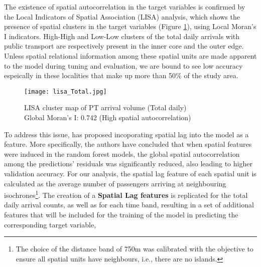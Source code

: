The existence of spatial autocorrelation in the target variables is confirmed by the Local Indicators of Spatial Association (LISA) analysis, which shows the presence of spatial clusters in the target variables (Figure \ref{fig:lisacluster}), using Local Moran's I indicators. High-High and Low-Low clusters of the total daily arrivals with public transport are respectively present in the inner core and the outer edge. Unless spatial relational information among these spatial units are made apparent to the model during tuning and evaluation, we are bound to see low accuracy espeically in these localities that make up more than 50\% of the study area.  

\begin{figure}[!ht]
    \centering
    \texttt{[image: lisa\_Total.jpg]}
    \captionsetup{justification=centering}
    \caption{LISA cluster map of PT arrival volume (Total daily)\\Global Moran's I: 0.742 (High spatial autocorrelation)}
    \label{fig:lisacluster}
\end{figure}

To address this issue, \citet{liuIncorporatingSpatialAutocorrelation2022} has proposed incoporating spatial lag into the model as a feature. More specifically, the authors have concluded that when spatial features were induced in the random forest models, the global spatial autocorrelation among the predictions' residuals was significantly reduced, also leading to higher validation accuracy. For our analysis, the spatial lag feature of each spatial unit is calculated as the average number of passengers arriving at neighbouring isochrones\footnote{The choice of the distance band of 750m was calibrated with the objective to ensure all spatial units have neighbours, i.e., there are no islands.}. The creation of a \textbf{Spatial Lag features} is replicated for the total daily arrival counts, as well as for each time band, resulting in a set of additional features that will be included for the training of the model in predicting the corresponding target variable,

